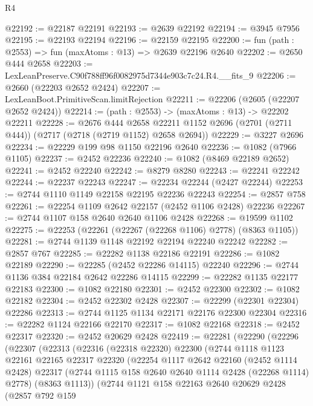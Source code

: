 \begin{lexlean}{R4}
\begin{coremodule}
@22192 := @22187 @22191
@22193 := @2639 @22192
@22194 := @3945 @7956
@22195 := @22193 @22194
@22196 := @22159 @22195
@22200 := fun (path : @2553) => fun (maxAtoms : @13) => @2639 @22196 @2640
@22202 := @2650 @444 @2658
@22203 := LexLeanPreserve.C90f788ff96f0082975d7344e903c7c24.R4.__fits_9
@22206 := @2660 (@22203 @2652 @2424)
@22207 := LexLeanBoot.PrimitiveScan.limitRejection
@22211 := @22206 (@2605 (@22207 @2652 @2424))
@22214 := (path : @2553) -> (maxAtoms : @13) -> @22202 @22211
@22228 := @2676
    @444
    @2658
    @22211
    @1152
    @2696
    (@2701 (@2711 @444))
    (@2717 (@2718 (@2719 @1152) @2658 @2694))
@22229 := @3227 @2696
@22234 := @22229 @199 @98 @1150 @22196 @2640
@22236 := @1082 (@7966 @1105)
@22237 := @2452 @22236
@22240 := @1082 (@8469 @22189 @2652)
@22241 := @2452 @22240
@22242 := @8279 @8280
@22243 := @22241 @22242
@22244 := @22237 @22243
@22247 := @22234 @22244 (@2427 @22244)
@22253 := @2744 @1110 @1149 @22158 @22195 @22236 @22243
@22254 := @2857 @758
@22261 := @22254 @1109 @2642 @22157 (@2452 @1106 @2428) @22236
@22267 := @2744 @1107 @158 @2640 @2640 @1106 @2428
@22268 := @19599 @1102
@22275 := @22253 (@22261 (@22267 (@22268 @1106) @2778) (@8363 @1105))
@22281 := @2744 @1139 @1148 @22192 @22194 @22240 @22242
@22282 := @2857 @767
@22285 := @22282 @1138 @22186 @22191
@22286 := @1082 @22189
@22290 := @22285 (@2452 @22286 @14115) @22240
@22296 := @2744 @1136 @384 @22184 @2642 @22286 @14115
@22299 := @22282 @1135 @22177 @22183
@22300 := @1082 @22180
@22301 := @2452 @22300
@22302 := @1082 @22182
@22304 := @2452 @22302 @2428
@22307 := @22299 (@22301 @22304) @22286
@22313 := @2744 @1125 @1134 @22171 @22176 @22300 @22304
@22316 := @22282 @1124 @22166 @22170
@22317 := @1082 @22168
@22318 := @2452 @22317
@22320 := @2452 @20629 @2428
@22419 := @22281
    (@22290
      (@22296
        (@22307
          (@22313
            (@22316
              (@22318 @22320)
              @22300
              (@2744
                @1118
                @1123
                @22161
                @22165
                @22317
                @22320
                (@22254
                  @1117
                  @2642
                  @22160
                  (@2452 @1114 @2428)
                  @22317
                  (@2744 @1115 @158 @2640 @2640 @1114 @2428 (@22268 @1114) @2778)
                  (@8363 @1113))
                (@2744
                  @1121
                  @158
                  @22163
                  @2640
                  @20629
                  @2428
                  (@2857
                    @792
                    @159

\end{coremodule}
\end{lexlean}
